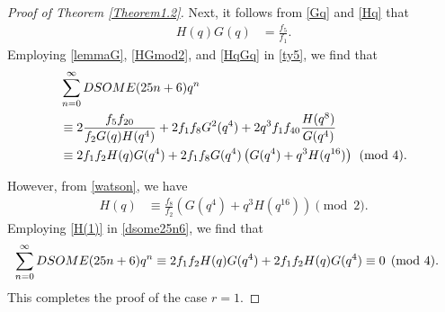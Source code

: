 \documentclass[10pt,a4paper]{amsart}
\begin{document}
\begin{proof}[Proof of Theorem \ref{Theorem1.2}]
    Next, it follows from \eqref{Gq} and \eqref{Hq} that
     \begin{align} H(q)G(q)&=\frac{f_{5}}{f_1}.\label{HqGq}
\end{align}
Employing \eqref{lemmaG}, \eqref{HGmod2}, and \eqref{HqGq} in \eqref{ty5}, we find that
 \begin{align}   \label{dsome25n6}&\sum_{n=0}^{\infty}DSOME(25n+6)q^n\\
 &\equiv 2\frac{f_5f_{20}}{f_2G(q)H(q^4)}+2f_1f_8G^2(q^4)+2q^3f_1f_{40}\dfrac{H(q^8)}{G(q^4)}\notag\\ 
&\equiv 2f_1f_2H(q)G(q^4)+2f_1f_8G(q^4)\left(G(q^4)+q^3H(q^{16})\right)\pmod{4}.\notag
\end{align}

However, from \eqref{watson}, we have
       \begin{align} H(q)&\equiv \frac{f_8}{f_2}\left(G(q^4)+q^3H(q^{16})\right)\pmod{2}.\label{H(1)}
        \end{align}
Employing \eqref{H(1)} in \eqref{dsome25n6}, we find that
    \begin{align}
\sum_{n=0}^{\infty}DSOME(25n+6)q^n&\equiv 2f_1f_2H(q)G(q^4)+2f_1f_2H(q)G(q^4)\equiv0\pmod{4}.\notag 
        \end{align}
        This completes the proof of the case $r=1$.
        

\end{proof}
\end{document}
